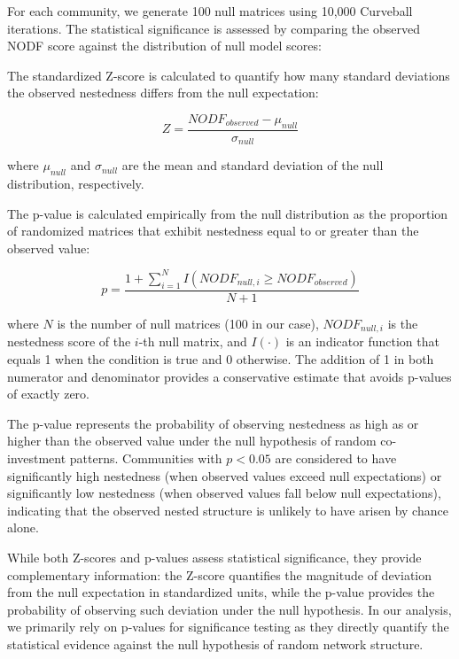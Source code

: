 For each community, we generate 100 null matrices using 10,000 Curveball iterations. The statistical significance is assessed by comparing the observed NODF score against the distribution of null model scores:


The standardized Z-score is calculated to quantify how many standard deviations the observed nestedness differs from the null expectation:

\begin{equation}
Z = \frac{NODF_{observed} - \mu_{null}}{\sigma_{null}}
\end{equation}

where $\mu_{null}$ and $\sigma_{null}$ are the mean and standard deviation of the null distribution, respectively.

The p-value is calculated empirically from the null distribution as the proportion of randomized matrices that exhibit nestedness equal to or greater than the observed value:

\begin{equation}
p = \frac{1 + \sum_{i=1}^{N} I(NODF_{null,i} \geq NODF_{observed})}{N + 1}
\end{equation}

where $N$ is the number of null matrices (100 in our case), $NODF_{null,i}$ is the nestedness score of the $i$-th null matrix, and $I(\cdot)$ is an indicator function that equals 1 when the condition is true and 0 otherwise. The addition of 1 in both numerator and denominator provides a conservative estimate that avoids p-values of exactly zero.

The p-value represents the probability of observing nestedness as high as or higher than the observed value under the null hypothesis of random co-investment patterns. Communities with $p < 0.05$ are considered to have significantly high nestedness (when observed values exceed null expectations) or significantly low nestedness (when observed values fall below null expectations), indicating that the observed nested structure is unlikely to have arisen by chance alone.

While both Z-scores and p-values assess statistical significance, they provide complementary information: the Z-score quantifies the magnitude of deviation from the null expectation in standardized units, while the p-value provides the probability of observing such deviation under the null hypothesis. In our analysis, we primarily rely on p-values for significance testing as they directly quantify the statistical evidence against the null hypothesis of random network structure.

